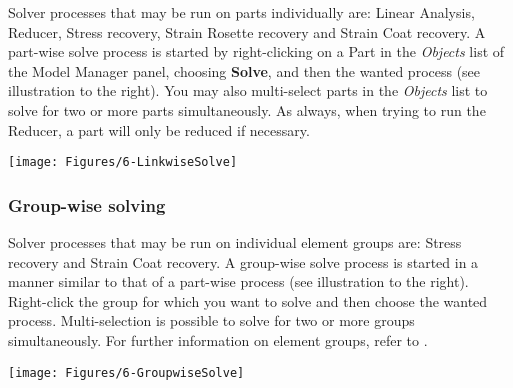 \noindent
\begin{minipage}{0.45\textwidth}
  \raggedright
  Solver processes that may be run on parts individually are: Linear Analysis,
  Reducer, Stress recovery, Strain Rosette recovery and Strain Coat recovery.
  A part-wise solve process is started by right-clicking on a Part in the
  {\sl Objects} list of the Model Manager panel, choosing \textbf{Solve},
  and then the wanted process (see illustration to the right).
  You may also multi-select parts in the {\sl Objects} list to solve for two or
  more parts simultaneously. As always, when trying to run the Reducer,
  a part will only be reduced if necessary.
\end{minipage}%
\hfill\begin{minipage}{0.5\textwidth}
  \texttt{[image: Figures/6-LinkwiseSolve]}
\end{minipage}

\clearpage

\subsubsection{Group-wise solving}

\noindent
\begin{minipage}{0.47\textwidth}
  \raggedright
  Solver processes that may be run on individual element groups are:
  Stress recovery and Strain Coat recovery.
  A group-wise solve process is started in a manner similar to that of
  a part-wise process (see illustration to the right). Right-click
  the group for which you want to solve and then choose the wanted process.
  Multi-selection is possible to solve for two or more groups simultaneously.
  For further information on element groups, refer to
  .
\end{minipage}%
\hfill\begin{minipage}{0.5\textwidth}
  \texttt{[image: Figures/6-GroupwiseSolve]}
\end{minipage}




